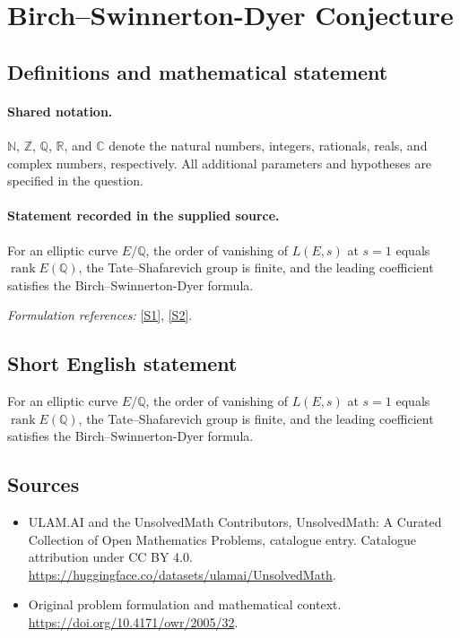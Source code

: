 \documentclass[11pt]{article}
\newcommand{\sref}[2]{\hyperlink{source:#1:#2}{[S#2]}}
\begin{document}
\section{Birch–Swinnerton-Dyer Conjecture}\label{statement}

\subsection{Definitions and mathematical statement}

\paragraph{Shared notation.}$\mathbb N$, $\mathbb Z$, $\mathbb Q$, $\mathbb R$, and $\mathbb C$ denote the natural numbers, integers, rationals, reals, and complex numbers, respectively. All additional parameters and hypotheses are specified in the question.


\paragraph{Statement recorded in the supplied source.}
For an elliptic curve $E/\mathbb Q$, the order of vanishing of $L(E,s)$ at $s=1$ equals $\operatorname{rank}E(\mathbb Q)$, the Tate–Shafarevich group is finite, and the leading coefficient satisfies the Birch–Swinnerton-Dyer formula.
\par\smallskip\textit{Formulation references:} \sref{statement}{1}, \sref{statement}{2}.
\subsection{Short English statement}
For an elliptic curve $E/\mathbb Q$, the order of vanishing of $L(E,s)$ at $s=1$ equals $\operatorname{rank}E(\mathbb Q)$, the Tate–Shafarevich group is finite, and the leading coefficient satisfies the Birch–Swinnerton-Dyer formula.
\subsection{Sources}
\begin{itemize}
\item[\hypertarget{source:statement:1}{S1}] ULAM.AI and the UnsolvedMath Contributors, UnsolvedMath: A Curated Collection of Open Mathematics Problems, catalogue entry. Catalogue attribution under CC BY 4.0.
\url{https://huggingface.co/datasets/ulamai/UnsolvedMath}.
\item[\hypertarget{source:statement:2}{S2}] Original problem formulation and mathematical context.
\url{https://doi.org/10.4171/owr/2005/32}.
\end{itemize}
\label{end:statement}
\end{document}
